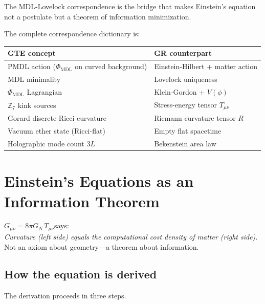 \documentclass[11pt,a4paper]{article}
\newcommand{\GN}{G_{\!N}}
\newcommand{\PHIMDL}{\Phi_{\mathrm{MDL}}}
\newcommand{\ZS}{\mathbb{Z}_7}
\begin{document}
The MDL-Lovelock correspondence is the bridge that makes Einstein's equation
not a postulate but a theorem of information minimization.

The complete correspondence dictionary is:

\begin{center}
\renewcommand{\arraystretch}{1.3}
\begin{tabular}{P{5.5cm}P{6.0cm}}
\toprule
GTE concept & GR counterpart \\
\midrule
PMDL action ($\PHIMDL$ on curved background) & Einstein-Hilbert + matter action \\
MDL minimality & Lovelock uniqueness \\
$\PHIMDL$ Lagrangian & Klein-Gordon + $V(\phi)$ \\
$\ZS$ kink sources & Stress-energy tensor $T_{\mu\nu}$ \\
Gorard discrete Ricci curvature & Riemann curvature tensor $R$ \\
Vacuum ether state (Ricci-flat) & Empty flat spacetime \\
Holographic mode count $3L$ & Bekenstein area law \\
\bottomrule
\end{tabular}
\end{center}

\section{Einstein's Equations as an Information Theorem}

\begin{tcolorbox}[colback=boxblue,colframe=blue!40!black,title=New reading of Einstein's equation]
$G_{\mu\nu} = 8\pi\GN\,T_{\mu\nu}$\quad says:\\[4pt]
\textit{Curvature (left side) equals the computational cost density of matter (right side).}\\[4pt]
Not an axiom about geometry---a theorem about information.
\end{tcolorbox}

\subsection{How the equation is derived}

The derivation proceeds in three steps.
\end{document}
